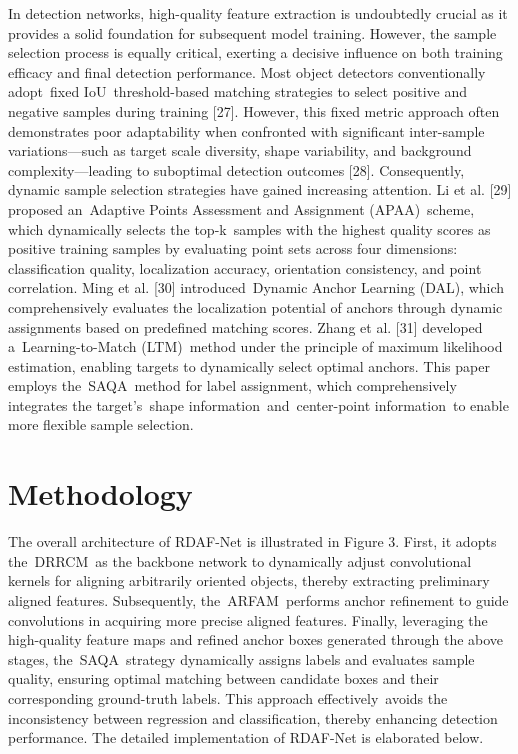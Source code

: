 \documentclass[10pt,twocolumn,final]{article}
\begin{document}
In detection networks, high-quality feature extraction is undoubtedly crucial as it provides a solid foundation for subsequent model training. However, the sample selection process is equally critical, exerting a decisive influence on both training efficacy and final detection performance. Most object detectors conventionally adopt fixed IoU threshold-based matching strategies to select positive and negative samples during training [27]. However, this fixed metric approach often demonstrates poor adaptability when confronted with significant inter-sample variations—such as target scale diversity, shape variability, and background complexity—leading to suboptimal detection outcomes [28]. Consequently, dynamic sample selection strategies have gained increasing attention. Li et al. [29] proposed an Adaptive Points Assessment and Assignment (APAA) scheme, which dynamically selects the top-k samples with the highest quality scores as positive training samples by evaluating point sets across four dimensions: classification quality, localization accuracy, orientation consistency, and point correlation. Ming et al. [30] introduced Dynamic Anchor Learning (DAL), which comprehensively evaluates the localization potential of anchors through dynamic assignments based on predefined matching scores. Zhang et al. [31] developed a Learning-to-Match (LTM) method under the principle of maximum likelihood estimation, enabling targets to dynamically select optimal anchors. This paper employs the SAQA method for label assignment, which comprehensively integrates the target's shape information and center-point information to enable more flexible sample selection.

\section{ Methodology }

The overall architecture of RDAF-Net is illustrated in Figure 3. First, it adopts the DRRCM as the backbone network to dynamically adjust convolutional kernels for aligning arbitrarily oriented objects, thereby extracting preliminary aligned features. Subsequently, the ARFAM performs anchor refinement to guide convolutions in acquiring more precise aligned features. Finally, leveraging the high-quality feature maps and refined anchor boxes generated through the above stages, the SAQA strategy dynamically assigns labels and evaluates sample quality, ensuring optimal matching between candidate boxes and their corresponding ground-truth labels. This approach effectively avoids the inconsistency between regression and classification, thereby enhancing detection performance. The detailed implementation of RDAF-Net is elaborated below.
\end{document}

